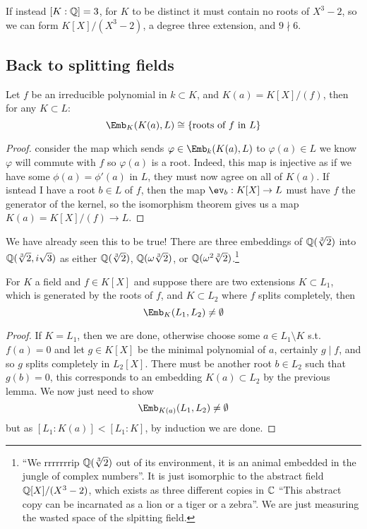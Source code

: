 \documentclass{article}
\begin{document}
If instead $[K:\mathbb{Q}]=3$, for $K$ to be distinct it must contain no roots of $X^3-2$, so we can form $K[X]/(X^3-2)$, a degree three extension, and $9\nmid 6$.

\subsection{Back to splitting fields}

\begin{lemma}
    Let $f$ be an irreducible polynomial in $k\subset K$, and $K(a) = K[X]/(f)$, then for any $K\subset L$:\[
        \Emb_K(K(a),L) \cong \{\text{roots of $f$ in $L$}\}
    \]\begin{proof}
        consider the map which sends $\varphi\in\Emb_k(K(a),L)$ to $\varphi(a)\in L$ we know $\varphi$ will commute with $f$ so $\varphi(a)$ is a root. Indeed, this map is injective as if we have some $\phi(a) = \phi'(a)$ in $L$, they must now agree on all of $K(a)$. If isntead I have a root $b\in L$ of $f$, then the map $\ev_b:K[X]\rightarrow L$ must have $f$ the generator of the kernel, so the isomorphism theorem gives us a map $K(a) = K[X]/(f) \rightarrow L$.
    \end{proof}
\end{lemma}

We have already seen this to be true! There are three embeddings of $\mathbb{Q}(\sqrt[3]{2})$ into $\mathbb{Q}(\sqrt[3]{2},i\sqrt{3})$ as either $\mathbb{Q}(\sqrt[3]{2})$, $\mathbb{Q}(\omega\sqrt[3]{2})$, or $\mathbb{Q}(\omega^2\sqrt[3]{2})$.\footnote{``We rrrrrrrip $\mathbb{Q}(\sqrt[3]{2})$ out of its environment, it is an animal embedded in the jungle of complex numbers''. It is just isomorphic to the abstract field $\mathbb{Q}[X]/(X^3-2)$, which exists as three different copies in $\mathbb{C}$ ``This abstract copy can be incarnated as a lion or a tiger or a zebra''. We are just measuring the wasted space of the slpitting field.}

\begin{lemma}
    For $K$ a field and $f\in K[X]$ and suppose there are two extensions $K\subset L_1$, which is generated by the roots of $f$, and $K\subset L_2$ where $f$ splits completely, then\[
    \Emb_K(L_1,L_2)\neq \emptyset
    \]\begin{proof}
        If $K=L_1$, then we are done, otherwise choose some $a\in L_1\setminus K$ s.t. $f(a)=0$ and let $g\in K[X]$ be the minimal polynomial of $a$, certainly $g\mid f$, and so $g$ splits completely in $L_2[X]$. There must be another root $b\in L_2$ such that $g(b)=0$, this corresponds to an embedding $K(a)\subset L_2$ by the previous lemma. We now just need to show \[
        \Emb_{K(a)}(L_1,L_2)\neq \emptyset
        \] but as $[L_1:K(a)] < [L_1 : K]$, by induction we are done.
    \end{proof}
\end{lemma}
\end{document}

